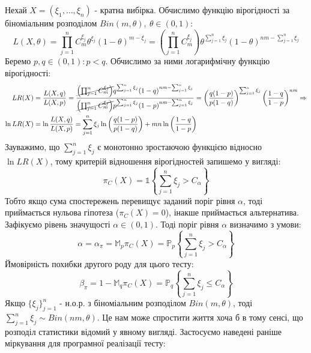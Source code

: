 \documentclass[12pt]{article}
\begin{document}
Нехай $X = (\xi_1, \ldots, \xi_n)$ - кратна вибірка. Обчислимо функцію вірогідності за біноміальним розподілом $Bin(m, \theta), \> \theta \in (0, 1)$:
\begin{equation*}
L(X, \theta) = \prod_{j = 1}^n C_m^{\xi_j} \theta^{\xi_j} (1 - \theta)^{m - \xi_j} = \left(\prod_{j = 1}^n C_m^{\xi_j}\right) \theta^{\sum_{j = 1}^n \xi_j} (1 - \theta)^{nm - \sum_{j = 1}^n \xi_j} 
\end{equation*}
Беремо $p, q \in (0,1): p < q$. Обчислимо за ними логарифмічну функцію вірогідності:
\begin{align*}
LR(X) &= \dfrac{L(X, q)}{L(X, p)} = \dfrac{\cancel{\left(\prod_{j = 1}^n C_m^{\xi_j}\right)} q^{\sum_{j = 1}^n \xi_j} (1 - q)^{nm - \sum_{j = 1}^n \xi_j} }{\cancel{\left(\prod_{j = 1}^n C_m^{\xi_j}\right)} p^{\sum_{j = 1}^n \xi_j} (1 - p)^{nm - \sum_{j = 1}^n \xi_j} } = \left(\dfrac{q(1 - p)}{p(1 - q)}\right)^{\sum_{j = 1}^n \xi_j}\left(\dfrac{1 - q}{1 - p}\right)^{nm} \Rightarrow
\\
\ln{LR(X)} &= \ln{\dfrac{L(X, q)}{L(X, p)}} = \sum_{j = 1}^n \xi_j \ln{\left(\dfrac{q(1 - p)}{p(1 - q)}\right)} + mn\ln{\left(\dfrac{1 - q}{1 - p}\right)}
\end{align*}
Зауважимо, що $\sum_{j = 1}^n \xi_j$ є монотонно зростаючою функцією відносно $\ln{LR(X)}$, тому критерій відношення вірогідностей запишемо у вигляді:
\begin{equation*}
\pi_C(X) = \mathds{1}\left\lbrace\sum_{j = 1}^n \xi_j > C_{\alpha}\right\rbrace
\end{equation*}
Тобто якщо сума спостережень перевищує заданий поріг рівня $\alpha$, тоді приймається нульова гіпотеза ($\pi_C(X) = 0$), інакше приймається альтернатива.
\newpage
Зафікуємо рівень значущості $\alpha \in (0, 1)$. Тоді поріг рівня $\alpha$ визначимо з умови:
\begin{equation*}
\alpha = \alpha_{\pi} = \mathbb{M}_p\pi_C(X) = \mathbb{P}_p\left\lbrace \sum_{j = 1}^n \xi_j > C_{\alpha} \right\rbrace
\end{equation*}
Ймовірність похибки другого роду для цього тесту:
\begin{equation*}
\beta_{\pi} = 1 - \mathbb{M}_q\pi_C(X) = \mathbb{P}_q\left\lbrace \sum_{j = 1}^n \xi_j \leqslant C_{\alpha} \right\rbrace
\end{equation*}
Якщо $\{\xi_j\}_{j=1}^n$ - н.о.р. з біноміальним розподілом $Bin(m, \theta)$, тоді $\sum_{j = 1}^n \xi_j \sim Bin(nm, \theta)$. Це нам може спростити життя хоча б в тому сенсі, що розподіл статистики відомий у явному вигляді. Застосуємо наведені раніше міркування для програмної реалізації тесту:
\end{document}
